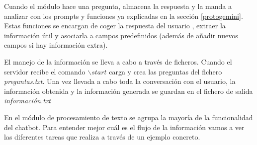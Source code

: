 Cuando el módulo hace una pregunta, almacena la respuesta y la manda a analizar con los prompts y funciones ya explicadas en la sección \ref{protogemini}. Estas funciones se encargan de coger la respuesta del usuario , extraer la información útil y asociarla a campos predefinidos (además de añadir nuevos campos si hay información extra).

El manejo de la información se lleva a cabo a través de ficheros. Cuando el servidor recibe el comando $\backslash start$ carga y crea las preguntas del fichero \textit{preguntas.txt}. Una vez llevada a cabo toda la conversación con el usuario, la información obtenida y la información generada se guardan en el fichero de salida \textit{información.txt}

En el módulo de procesamiento de texto se agrupa la mayoría de la funcionalidad del chatbot. Para entender mejor cuál es el flujo de la información vamos a ver las diferentes tareas que realiza a través de un ejemplo concreto. 

